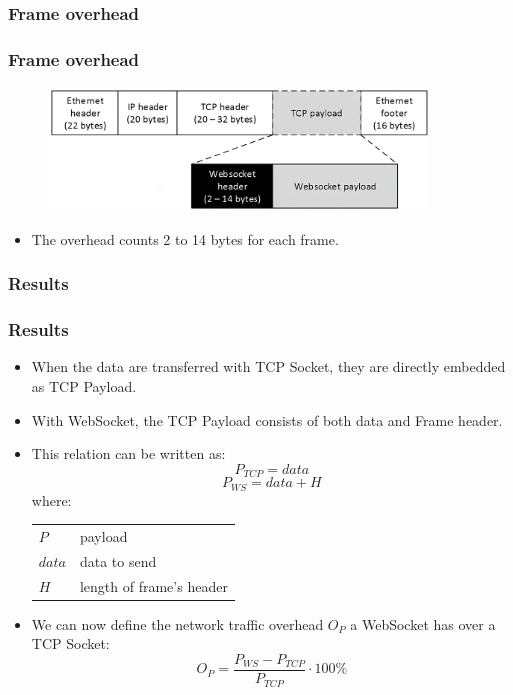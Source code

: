 \documentclass{beamer}
\makeatletter
\newenvironment{conditions}
  {\par\vspace{\abovedisplayskip}\noindent\begin{tabular}{>{$}l<{$} @{${}={}$} l}}
  {\end{tabular}\par\vspace{\belowdisplayskip}}
\makeatother
\begin{document}
\subsubsection{Frame overhead}
\begin{frame}
    \frametitle{Frame overhead}
    \begin{figure}
        \includegraphics[width=0.9\textwidth]{images/websocket_frame_overhead.jpeg}
    \end{figure}
    \pause{}
    \begin{itemize}[<+->]
        \item The overhead counts \alert{2 to 14 bytes} for each frame.
    \end{itemize}
\end{frame}

\subsubsection{Results}
\begin{frame}
    \frametitle{Results}
    \begin{itemize}[<+->]
        \item When the data are transferred with TCP Socket, they are \alert{directly
                  embedded as TCP Payload}.
        \item With WebSocket, the TCP Payload consists of both data and Frame header.
        \item This relation can be written as:
              \begin{equation}
                  P_{TCP} = data
              \end{equation}
              \begin{equation}
                  P_{WS} = data + H
              \end{equation}
              where:
              \begin{conditions}
                  P    & payload                 \\
                  data & data to send            \\
                  H    & length of frame's header
              \end{conditions}
        \item We can now define the \alert{network traffic overhead $O_P$} a WebSocket has
              over a TCP Socket:
              \begin{equation}
                  O_P = \frac{P_{WS} - P_{TCP}}{P_{TCP}}\cdot 100\%
              \end{equation}
    \end{itemize}
\end{frame}
\end{document}
